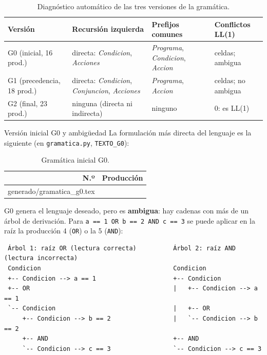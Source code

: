 \documentclass[11pt,letterpaper]{article}
\makeatletter
\renewcommand\subsection{\@startsection{subsection}{2}{\z@}{-2.6ex\@plus -1ex \@minus -.2ex}{1.0ex \@plus .2ex}%
  {\normalfont\large\bfseries}}
\newcommand{\filas}[1]{\@@input #1 }
\newcommand{\cod}[1]{\texttt{#1}}
\newcommand{\ruta}[1]{\nolinkurl{#1}}
\newcommand{\T}[1]{\texttt{#1}}
\newcommand{\NT}[1]{\textit{#1}}
\newcommand{\cabeza}{\rowcolor{cabecera}}
\newenvironment{codigo}{\par\small\vspace{2pt}}{\par\vspace{2pt}}
\makeatother
\begin{document}
\begin{longtable}{>{\raggedright}p{3.4cm}>{\raggedright}p{3.6cm}>{\raggedright}p{4.0cm}p{3.8cm}}
\caption{Diagnóstico automático de las tres versiones de la gramática.}\label{tab:versiones}\\
\hline\cabeza \textbf{Versión} & \textbf{Recursión izquierda} & \textbf{Prefijos comunes} & \textbf{Conflictos LL(1)}\\\hline\endfirsthead
G0 (inicial, 16 prod.) & directa: \NT{Condicion}, \NT{Acciones} & \NT{Programa}, \NT{Condicion}, \NT{Accion} & \NumConflictosGcero{} celdas; ambigua\\
G1 (precedencia, 18 prod.) & directa: \NT{Condicion}, \NT{Conjuncion}, \NT{Acciones} & \NT{Programa}, \NT{Accion} & \NumConflictosGuno{} celdas; no ambigua\\
G2 (final, 23 prod.) & ninguna (directa ni indirecta) & ninguno & 0: es LL(1)\\\hline
\end{longtable}

\subsection{Versión inicial G0 y ambigüedad}
La formulación más directa del lenguaje es la siguiente (en \cod{gramatica.py}, \ruta{TEXTO_G0}):

\begin{longtable}{r>{\raggedright\arraybackslash}p{13.8cm}}
\caption{Gramática inicial G0.}\label{tab:g0}\\
\hline\cabeza \textbf{N.º} & \textbf{Producción}\\\hline\endfirsthead
\filas{generado/gramatica_g0.tex}
\hline
\end{longtable}

G0 genera el lenguaje deseado, pero es \textbf{ambigua}: hay cadenas con más de un árbol de derivación. Para
\T{a == 1 OR b == 2 AND c == 3} se puede aplicar en la raíz la producción 4 (\T{OR}) o la 5 (\T{AND}):

\begin{codigo}
\begin{verbatim}
 Árbol 1: raíz OR (lectura correcta)          Árbol 2: raíz AND (lectura incorrecta)
 Condicion                                    Condicion
 +-- Condicion --> a == 1                     +-- Condicion
 +-- OR                                       |   +-- Condicion --> a == 1
 `-- Condicion                                |   +-- OR
     +-- Condicion --> b == 2                 |   `-- Condicion --> b == 2
     +-- AND                                  +-- AND
     `-- Condicion --> c == 3                 `-- Condicion --> c == 3
\end{verbatim}
\end{codigo}
\end{document}
